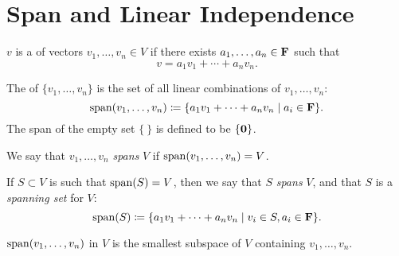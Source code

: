 \section{Span and Linear Independence}
\begin{definition}
$v$ is a  of vectors $v_1,\dots,v_n\in V$ if there exists $a_1,\dots,a_n\in\mathbf F$ such that
\[v=a_1v_1+\cdots+a_nv_n.\]
\end{definition}

\begin{definition}[Span]
The  of $\{v_1,\dots,v_n\}$ is the set of all linear combinations of $v_1,\dots,v_n$:
\[\operatorname{span}(v_1,\dots,v_n)\coloneqq\{a_1v_1+\cdots+a_nv_n\mid a_i\in\mathbf F\}.\]
The span of the empty set $\{\:\}$ is defined to be $\{\vb{0}\}$.

We say that $v_1,\dots,v_n$ \emph{spans} $V$ if $\operatorname{span}(v_1,\dots,v_n)=V$.

If $S\subset V$ is such that $\operatorname{span}(S)=V$, then we say that $S$ \emph{spans} $V$, and that $S$ is a \emph{spanning set} for $V$:
\[\operatorname{span}(S)\coloneqq\{a_1v_1+\cdots+a_nv_n\mid v_i\in S, a_i\in\mathbf F\}.\]
\end{definition}

\begin{proposition}
$\operatorname{span}(v_1,\dots,v_n)$ in $V$ is the smallest subspace of $V$ containing $v_1,\dots,v_n$.
\end{proposition}

